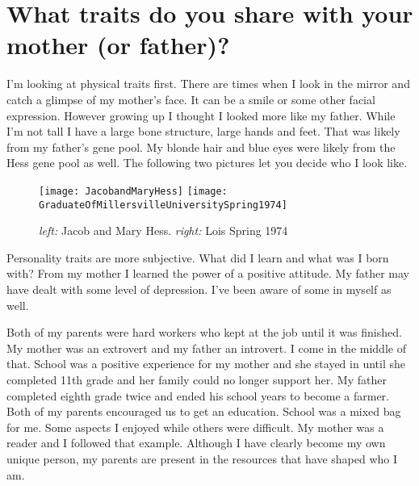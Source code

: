 \section{What traits do you share with your mother (or father)?}
I'm looking at physical traits first.
There are times when I look in the mirror and catch a glimpse of my mother's face.
It can be a smile or some other facial expression.
However growing up I thought I looked more like my father.
While I'm not tall I have a large bone structure, large hands and feet.
That was likely from my father's gene pool.
My blonde hair and blue eyes were likely from the Hess gene pool as well.
The following two pictures let you decide who I look like.
\begin{figure}
\centering
\texttt{[image: JacobandMaryHess]}
\texttt{[image: GraduateOfMillersvilleUniversitySpring1974]}
\caption{\textit{left:} Jacob and Mary Hess. \textit{right:} Lois Spring 1974}
\end{figure}


Personality traits are more subjective.
What did I learn and what was I born with? From my mother I learned the power of a positive attitude.
My father may have dealt with some level of depression.
I've been aware of some in myself as well.

Both of my parents were hard workers who kept at the job until it was finished.
My mother was an extrovert and my father an introvert.
I come in the middle of that.
School was a positive experience for my mother and she stayed in until she completed 11th grade and her family could no longer support her.
My father completed eighth grade twice and ended his school years to become a farmer.
Both of my parents encouraged us to get an education.
School was a mixed bag for me.
Some aspects I enjoyed while others were difficult.
My mother was a reader and I followed that example.
Although I have clearly become my own unique person, my parents are present in the resources that have shaped who I am.
